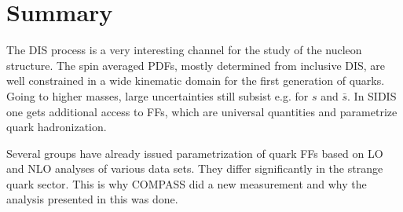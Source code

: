 \section{Summary}

The DIS process is a very interesting channel for the study of the nucleon structure. The spin averaged PDFs, mostly determined from inclusive DIS, are well constrained in a wide kinematic domain for the first generation of quarks. Going to higher masses, large uncertainties still subsist e.g. for $s$ and $\bar{s}$. In SIDIS one gets additional access to FFs, which are universal quantities and parametrize quark hadronization.

Several groups have already issued parametrization of quark FFs based on LO and NLO analyses of various data sets. They differ significantly in the strange quark sector. This is why COMPASS did a new measurement and why the analysis presented in this was done.

